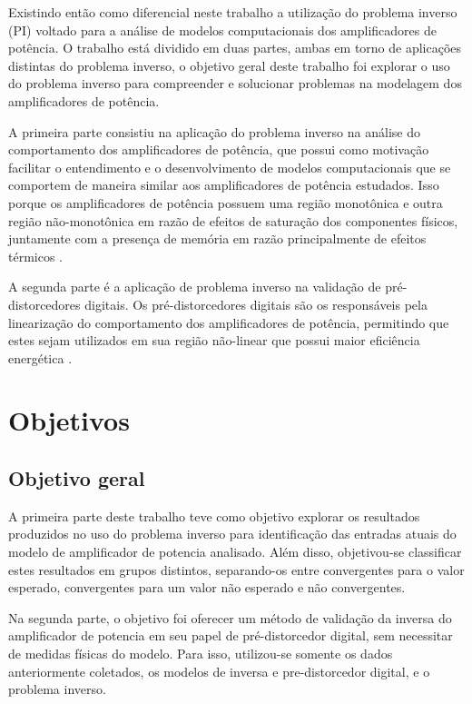 Existindo então como diferencial neste trabalho a utilização do problema inverso (PI) voltado para a análise de modelos computacionais dos amplificadores de potência. O trabalho está dividido em duas partes, ambas em torno de aplicações distintas do problema inverso, o objetivo geral deste trabalho foi explorar o uso do problema inverso para compreender e solucionar problemas na modelagem dos amplificadores de potência.

A primeira parte consistiu na aplicação do problema inverso na análise do comportamento dos amplificadores de potência, que possui como motivação facilitar o entendimento e o desenvolvimento de modelos computacionais que se comportem de maneira similar aos amplificadores de potência estudados. Isso porque os amplificadores de potência possuem uma região monotônica e outra região não-monotônica em razão de efeitos de saturação dos componentes físicos, juntamente com a presença de memória em razão principalmente de efeitos térmicos \cite{pedro_comparative_2005}.

A segunda parte é a aplicação de problema inverso na validação de pré-distorcedores digitais. Os pré-distorcedores digitais são os responsáveis pela linearização do comportamento dos amplificadores de potência, permitindo que estes sejam utilizados em sua região não-linear que possui maior eficiência energética \cite{kenington_high-linearity_2000}.

\section{Objetivos} \label{sec:introd-obje}

\subsection{Objetivo geral} \label{ssec:introd-obje-geral}
A primeira parte deste trabalho teve como objetivo explorar os resultados produzidos no uso do problema inverso para identificação das entradas atuais do modelo de amplificador de potencia analisado. Além disso, objetivou-se classificar estes resultados em grupos distintos, separando-os entre convergentes para o valor esperado, convergentes para um valor não esperado e não convergentes.

Na segunda parte, o objetivo foi oferecer um método de validação da inversa do amplificador de potencia em seu papel de pré-distorcedor digital, sem necessitar de medidas físicas do modelo. Para isso, utilizou-se somente os dados anteriormente coletados, os modelos de inversa e pre-distorcedor digital, e o problema inverso.

